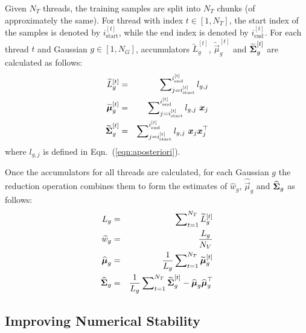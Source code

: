Given $N_T$ threads, the training samples are split into $N_T$ chunks (of approximately the same).
For thread with index $t \in [1,N_T]$, the start index of the samples is denoted by $i^{[t]}_{\textrm{start}}$,
while the end index is denoted by $i^{[t]}_{\textrm{end}}$.
For each thread $t$ and Gaussian $g \in [1,N_G]$, accumulators $\widetilde{L}_g^{[t]}$, $\widetilde{\Vec{\mu}}_g^{[t]}$ and $\widetilde{{\boldsymbol{\Sigma}}}_g^{[t]}$
are calculated as follows:
%
\begin{eqnarray}
  \widetilde{L}_g^{[t]}            & = & \sum\nolimits_{j = i^{[t]}_{\textrm{start}}}^{i^{[t]}_{\textrm{end}}} l_{g,j}                             \\ %
  \widetilde{\Vec{\mu}}_g^{[t]}    & = & \sum\nolimits_{j = i^{[t]}_{\textrm{start}}}^{i^{[t]}_{\textrm{end}}} l_{g,j} ~ \Vec{x}_j                 \\ %
  \widetilde{\Mat{\Sigma}}_g^{[t]} & = & \sum\nolimits_{j = i^{[t]}_{\textrm{start}}}^{i^{[t]}_{\textrm{end}}} l_{g,j} ~ \Vec{x}_j \Vec{x}_j^\top    %
\end{eqnarray}%
%
where $l_{g,j}$ is defined in Eqn.~(\ref{eqn:aposteriori}).

Once the accumulators for all threads are calculated,
for each Gaussian $g$ the reduction operation combines them to form the estimates of $\widehat{w}_g$, $\widehat{\Vec{\mu}}_g$ and $\widehat{{\boldsymbol{\Sigma}}}_g$ as follows:
%
\begin{eqnarray}
  L_g                      & = & \sum\nolimits_{t=1}^{N_T} \widetilde{L}_g^{[t]}                           \\ %
  \widehat{w}_g            & = & \frac{L_g}{N_V}                                                           \\
  \widehat{\Vec{\mu}}_g    & = & \frac{1}{L_g} \sum\nolimits_{t=1}^{N_T} \widetilde{\Vec{\mu}}_g^{[t]}     \\
  \widehat{\Mat{\Sigma}}_g & = & \frac{1}{L_g} \sum\nolimits_{t=1}^{N_T} \widetilde{\Mat{\Sigma}}_g^{[t]} - \widehat{\Vec{\mu}}_g \widehat{\Vec{\mu}}_g^\top
\end{eqnarray}

\subsection{Improving Numerical Stability}

